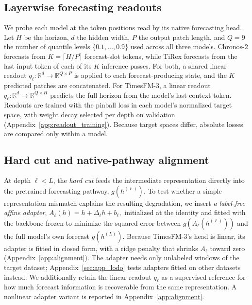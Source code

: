 \documentclass{article} %
\begin{document}
\subsection{Layerwise forecasting readouts}
\label{sec:layerwise_readouts}

We probe each model at the token positions read by its native forecasting head. Let $H$ be the
horizon, $d$ the hidden width, $P$ the output patch length, and $Q=9$ the number of quantile levels $\{0.1,\dots,0.9\}$ used across all three models. Chronos-2 forecasts from $K=\lceil H/P\rceil$ forecast-slot tokens, while TiRex forecasts from the last input token of
each of its $K$ inference passes. For both, a shared linear readout
$q_\ell:\mathbb{R}^{d}\to\mathbb{R}^{Q\times P}$ is applied to each forecast-producing state, and the $K$ predicted patches are concatenated. For TimesFM-3, a linear readout
$q_\ell:\mathbb{R}^{d}\to\mathbb{R}^{Q\times H}$ predicts the full horizon from the model's last context token. Readouts are trained with the pinball loss in each model's normalized target space, with weight decay selected per depth on validation (Appendix~\ref{app:readout_training}). Because target spaces differ, absolute losses are compared only within a model.


\subsection{Hard cut and native-pathway alignment}
\label{sec:adapter}

At depth $\ell<L$, the \emph{hard cut} feeds the intermediate representation directly into the pretrained forecasting pathway, $g(h^{(\ell)})$. To test whether a simple representation mismatch explains the resulting degradation, we insert \textit{a label-free affine adapter},
$
A_\ell(h)=h+\Delta_\ell h+b_\ell,
$
initialized at the identity and fitted with the backbone frozen to minimize the squared error between $g(A_\ell(h^{(\ell)}))$ and the full model's own forecast $g(h^{(L)})$. Because TimesFM-3's head is linear, its adapter is fitted in closed form, with a ridge penalty that shrinks $A_\ell$ toward zero (Appendix~\ref{app:alignment}). The adapter needs only unlabeled windows of the target dataset; Appendix~\ref{sec:app_lodo} tests adapters fitted on other datasets instead. We additionally retain the linear readout $q_\ell$ as a supervised reference for how much forecast information is recoverable from the same representation. A nonlinear adapter variant is reported in Appendix~\ref{app:alignment}.
\end{document}
